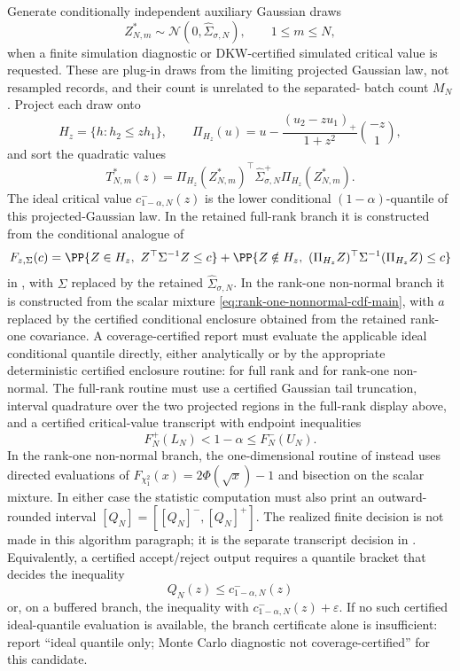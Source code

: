 Generate conditionally independent auxiliary Gaussian draws
\[
Z_{N,m}^{\ast}\sim\mathcal N(0,\widehat\Sigma_{\sigma,N}),
\qquad 1\le m\le N,
\]
when a finite simulation diagnostic or DKW-certified simulated critical value
is requested.  These are plug-in draws from the limiting projected Gaussian
law, not resampled records, and their count is unrelated to the separated-
batch count \(M_N\).  Project each draw onto
\[
H_z=\{h:h_2\le zh_1\},\qquad
\Pi_{H_z}(u)
=u-\frac{(u_2-zu_1)_+}{1+z^2}\binom{-z}{1},
\]
and sort the quadratic values
\[
T_{N,m}^{\ast}(z)
=\Pi_{H_z}(Z_{N,m}^{\ast})^\top
\widehat\Sigma_{\sigma,N}^{+}
\Pi_{H_z}(Z_{N,m}^{\ast}).
\]
The ideal critical value \(c^{-}_{1-\alpha,N}(z)\) is the lower conditional
\((1-\alpha)\)-quantile of this projected-Gaussian law.  In the retained
full-rank branch it is constructed from the conditional analogue of
\[
F_{z,\Sigma}(c)=
\PP\{Z\in H_z,\ Z^\top\Sigma^{-1}Z\le c\}
+\PP\{Z\notin H_z,\
(\Pi_{H_z}Z)^\top\Sigma^{-1}(\Pi_{H_z}Z)\le c\}
\]
in , with
\(\Sigma\) replaced by the retained \(\widehat\Sigma_{\sigma,N}\).  In the
rank-one non-normal branch it is constructed from the scalar mixture
\eqref{eq:rank-one-nonnormal-cdf-main}, with \(a\) replaced by the certified
conditional enclosure obtained from the retained rank-one covariance.  A
coverage-certified report must evaluate the applicable ideal conditional
quantile directly, either analytically or by the appropriate deterministic
certified enclosure routine:
for full rank and
for rank-one non-normal.  The full-rank
routine must use a certified Gaussian tail truncation, interval quadrature over
the two projected regions in the full-rank display above, and a certified
critical-value transcript with endpoint inequalities
\[
F_N^+(L_N)<1-\alpha\le F_N^-(U_N).
\]
In the rank-one non-normal branch, the one-dimensional
routine of
instead uses directed evaluations of \(F_{\chi^2_1}(x)=2\Phi(\sqrt x)-1\)
and bisection on the scalar mixture.  In either case the statistic computation
must also print an outward-rounded interval
\([Q_N]=[[Q_N]^-,[Q_N]^+]\).  The realized finite decision is not made in this
algorithm paragraph; it is the separate transcript decision in
.  Equivalently, a
certified accept/reject output requires a quantile bracket that decides the
inequality
\[
Q_N(z)\le c^{-}_{1-\alpha,N}(z)
\]
or, on a buffered branch, the inequality with
\(c^{-}_{1-\alpha,N}(z)+\varepsilon\).  If no such certified ideal-quantile
evaluation is available, the branch certificate alone is insufficient: report
``ideal quantile only; Monte Carlo diagnostic not coverage-certified'' for
this candidate.

